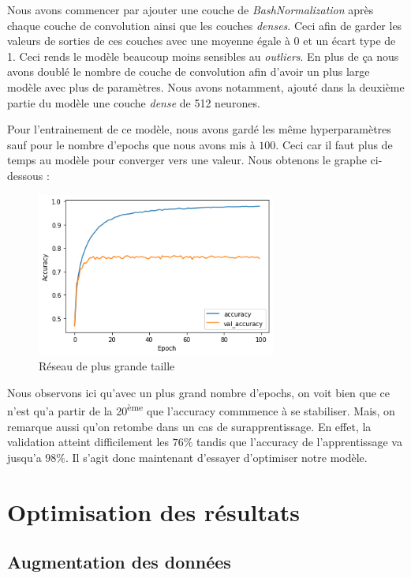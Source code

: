 \documentclass[12pt,titlepage]{article}
\begin{document}
Nous avons commencer par ajouter une couche de \textit{BashNormalization} après chaque couche de convolution ainsi que les couches \textit{denses}. Ceci afin de garder les valeurs de sorties de ces couches avec une moyenne égale à 0 et un écart type de 1. Ceci rends le modèle beaucoup moins sensibles au \textit{outliers}. En plus de ça nous avons doublé le nombre de couche de convolution afin d'avoir un plus large modèle avec plus de paramètres. Nous avons notamment, ajouté dans la deuxième partie du modèle une couche \textit{dense} de 512 neurones.

Pour l'entrainement de ce modèle, nous avons gardé les même hyperparamètres sauf pour le nombre d'epochs que nous avons mis à $100$. Ceci car il faut plus de temps au modèle pour converger vers une valeur. Nous obtenons le graphe ci-dessous : 

\newpage

\begin{figure}[!h]
  \centering
  \includegraphics[width=0.7\textwidth]{img/Model1_without_dataug_acc.png}
  \caption{Réseau de plus grande taille}
\end{figure}

Nous observons ici qu'avec un plus grand nombre d'epochs, on voit bien que ce n'est qu'a partir de la 20\textsuperscript{ème} que l'accuracy commmence à se stabiliser. Mais, on remarque aussi qu'on retombe dans un cas de surapprentissage. En effet, la validation atteint difficilement les $76\%$ tandis que l'accuracy de l'apprentissage va jusqu'a $98\%$. Il s'agit donc maintenant d'essayer d'optimiser notre modèle.

\section{Optimisation des résultats}

\subsection{Augmentation des données}
\end{document}
